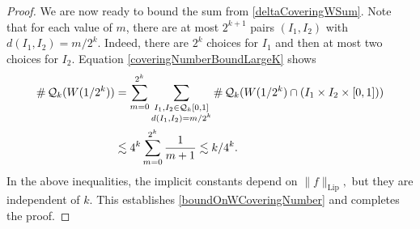 \begin{proof}
	We are now ready to bound the sum from \eqref{deltaCoveringWSum}. Note that for each value of $m$, there are at most $2^{k+1}$ pairs $(I_1,I_2)$ with $d(I_1,I_2) = m/2^k$. Indeed, there are $2^k$ choices for $I_1$ and then at most two choices for $I_2$. Equation  \eqref{coveringNumberBoundLargeK} shows 
	\begin{align*}
		\# \operatorname{\mathcal{Q}}_k(W(1/2^k)) &= \sum_{m = 0}^{2^k} \sum_{\substack{I_1, I_2 \in \operatorname{\mathcal{Q}}_k[0,1]\\d(I_1,I_2) = m/2^k}} \# \operatorname{\mathcal{Q}}_k(W(1/2^k) \cap (I_1 \times I_2 \times [0,1]))\\
		&\lesssim 4^k \sum_{m = 0}^{2^k} \frac{1}{m+1} \lesssim k/4^k.
	\end{align*}
	In the above inequalities, the implicit constants depend on $\| f \|_{\text{Lip}},$ but they are independent of $k$. This establishes \eqref{boundOnWCoveringNumber} and completes the proof.
\end{proof}

\endinput